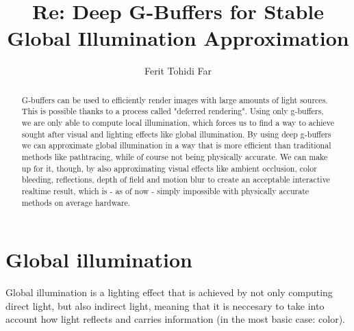 \documentclass{ACGSeminar}
\begin{document}
\title{Re: Deep G-Buffers for Stable Global Illumination Approximation}

\author{Ferit Tohidi Far}

\maketitle


\begin{abstract}%
G-buffers can be used to efficiently render images with large amounts of light sources. This is possible thanks to a process called "deferred rendering". Using 
only g-buffers, we are only able to compute local illumination, which forces us to find a way to achieve sought after visual and lighting effects like global 
illumination. By using deep g-buffers we can approximate global illumination in a way that is more efficient than traditional methods like pathtracing, 
while of course not being physically accurate. We can make up for it, though, by also approximating visual effects like ambient occlusion, color bleeding, reflections, 
depth of field and motion blur to create an acceptable interactive realtime result, which is - as of now - simply impossible with physically accurate methods on 
average hardware.
\end{abstract}

\tableofcontents

\label{cha:references}

\newpage

\label{cha:introduction}
\section{Global illumination}
	Global illumination is a lighting effect that is achieved by not only computing direct light, but also indirect light, meaning that it is neccesary to take
	into account how light reflects and carries information (in the most basic case: color).
\end{document}
